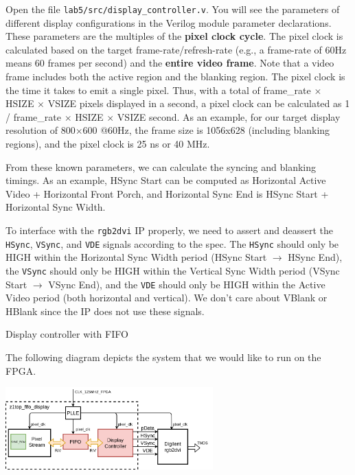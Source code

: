 \documentclass[11pt]{article}
\makeatletter
\renewcommand{\subsection}
{\@startsection {subsection}{1}{0pt}
 {-1ex}
 {0.5ex}
 {\bfseries\normalsize}}
\makeatother
\begin{document}
Open the file \verb|lab5/src/display_controller.v|. You will see the parameters of different display configurations in the Verilog module parameter declarations. These parameters are the multiples of the \textbf{pixel clock cycle}. The pixel clock is calculated based on the target frame-rate/refresh-rate (e.g., a frame-rate of 60Hz means 60 frames per second) and the \textbf{entire video frame}. Note that a video frame includes both the active region and the blanking region. The pixel clock is the time it takes to emit a single pixel. Thus, with a total of frame\_rate $\times$ HSIZE $\times$ VSIZE pixels displayed in a second, a pixel clock can be calculated as 1 / frame\_rate $\times$ HSIZE $\times$ VSIZE second. As an example, for our target display resolution of 800$\times$600 @60Hz, the frame size is 1056x628 (including blanking regions), and the pixel clock is 25 ns or 40 MHz.

From these known parameters, we can calculate the syncing and blanking timings. As an example, HSync Start can be computed as Horizontal Active Video + Horizontal Front Porch, and Horizontal Sync End is HSync Start + Horizontal Sync Width.

To interface with the \verb|rgb2dvi| IP properly, we need to assert and deassert the \verb|HSync|, \verb|VSync|, and \verb|VDE| signals according to the spec. The \verb|HSync| should only be HIGH within the Horizontal Sync Width period (HSync Start $\rightarrow$ HSync End), the \verb|VSync| should only be HIGH within the Vertical Sync Width period (VSync Start $\rightarrow$ VSync End), and the \verb|VDE| should only be HIGH within the Active Video period (both horizontal and vertical). We don't care about VBlank or HBlank since the IP does not use these signals.

\subsection{Display controller with FIFO}



The following diagram depicts the system that we would like to run on the FPGA.

\begin{center}
\includegraphics[width=0.6\textwidth]{figs/z1top_fifo_display.png}
\end{center}
\end{document}
